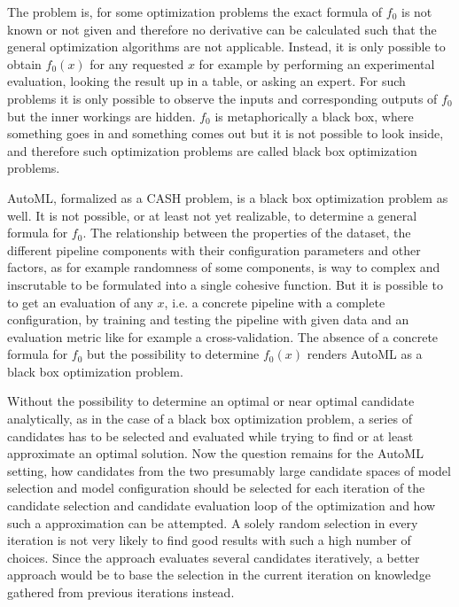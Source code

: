 The problem is, for some optimization problems the exact formula of $f_0$ is not known or not given and therefore no derivative can be calculated such that the general optimization algorithms are not applicable.
Instead, it is only possible to obtain $f_0(x)$ for any requested $x$ for example by performing an experimental evaluation, looking the result up in a table, or asking an expert.
For such problems it is only possible to observe the inputs and corresponding outputs of $f_0$ but the inner workings are hidden.
$f_0$ is metaphorically a black box, where something goes in and something comes out but it is not possible to look inside, and therefore such optimization problems are called black box optimization problems.

AutoML, formalized as a CASH problem, is a black box optimization problem as well.
It is not possible, or at least not yet realizable, to determine a general formula for $f_0$.
The relationship between the properties of the dataset, the different pipeline components with their configuration parameters and other factors, as for example randomness of some components, is way to complex and inscrutable to be formulated into a single cohesive function.\newline
But it is possible to to get an evaluation of any $x$, i.e. a concrete pipeline with a complete configuration, by training and testing the pipeline with given data and an evaluation metric like for example a cross-validation.
The absence of a concrete formula for $f_0$ but the possibility to determine $f_0(x)$ renders AutoML as a black box optimization problem.

Without the possibility to determine an optimal or near optimal candidate analytically, as in the case of a black box optimization problem, a series of candidates has to be selected and evaluated while trying to find or at least approximate an optimal solution.
Now the question remains for the AutoML setting, how candidates from the two presumably large candidate spaces of model selection and model configuration should be selected for each iteration of the candidate selection and candidate evaluation loop of the optimization and how such a approximation can be attempted.\newline
A solely random selection in every iteration is not very likely to find good results with such a high number of choices.
Since the approach evaluates several candidates iteratively, a better approach would be to base the selection in the current iteration on knowledge gathered from previous iterations instead.

